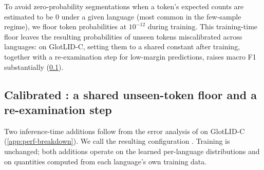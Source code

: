 

To avoid zero-probability segmentations when a token's expected counts are
estimated to be 0 under a given language (most common in the few-sample
regime), we floor token probabilities at $10^{-12}$ during training. This
training-time floor leaves the resulting probabilities of unseen tokens
miscalibrated across languages: on GlotLID-C, setting them to a shared
constant after training, together with a re-examination step for low-margin
predictions, raises macro F1 substantially (\cref{sec:calibration}).


\subsection{Calibrated \unilid: a shared unseen-token floor and a
re-examination step}\label{sec:calibration}

Two inference-time additions follow from the error analysis of \unilid on
GlotLID-C (\cref{app:perf-breakdown}). We call the resulting configuration
. Training is unchanged; both additions operate on
the learned per-language distributions and on quantities computed from each
language's own training data.

